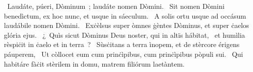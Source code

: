~Laudáte, púeri, Dòminum~; laudáte nomen Dòmini. 
~Sit nomen Dòmini benedìctum, ex hoc nunc, et usque in sáeculum. 
~A solis ortu usque ad occásum laudábile nomen Dòmini. 
~Exċèlsus super òmnes ġèntes Dòminus, et super ċaelos glória ejus. 
~¿~Quìs sicut Dòminus Deus noster, qui in altïs hábitat, 
~et humìlia rèspiċit in ċaelo et in terra~? 
~Sùsċitans a terra ìnopem, et de stèrcore érigens páuperem, 
~Ut còllocet eum cum prinċìpibus, cum prinċìpibus pòpuli sui. 
~Qui habitáre fàċit stèrilem in domu, matrem filiórum laetàntem. 
